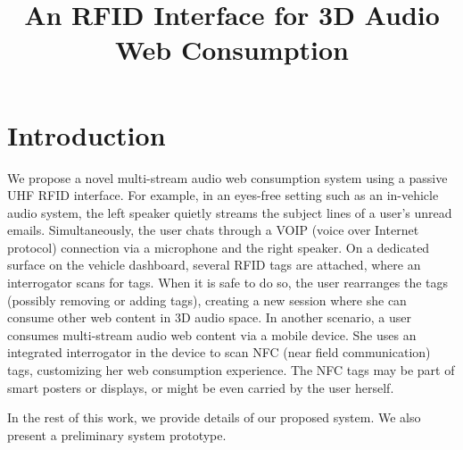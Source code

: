\documentclass[conference]{IEEEtran}
\begin{document}
\title{An RFID Interface for 3D Audio Web Consumption}
\author{
\and
{}

}
\maketitle

\section{Introduction}
We propose a novel multi-stream audio web consumption system using a passive UHF RFID interface.  For example, in an eyes-free setting such as an in-vehicle audio system, the left speaker quietly streams the subject lines of a user's unread emails.  Simultaneously, the user chats through a VOIP (voice over Internet protocol) connection via a microphone and the right speaker.  On a dedicated surface on the vehicle dashboard, several RFID tags are attached, where an interrogator scans for tags.  When it is safe to do so, the user rearranges the tags (possibly removing or adding tags), creating a new session where she can consume other web content in 3D audio space.  In another scenario, a user consumes multi-stream audio web content via a mobile device.  She uses an integrated interrogator in the device to scan NFC (near field communication) tags, customizing her web consumption experience.  The NFC tags may be part of smart posters or displays, or might be even carried by the user herself.

In the rest of this work, we provide details of our proposed system.  We also present a preliminary system prototype.
\end{document}

